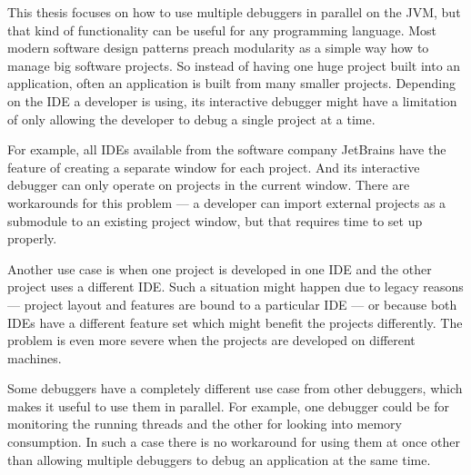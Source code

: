 \documentclass[..thesis.tex]{subfiles}
\begin{document}
This thesis focuses on how to use multiple debuggers in parallel on the JVM, but that kind of functionality can be useful for any programming language. 
Most modern software design patterns preach modularity as a simple way how to manage big software projects.
So instead of having one huge project built into an application, often an application is built from many smaller projects.
Depending on the IDE a developer is using, its interactive debugger might have a limitation of only allowing the developer to debug a single project at a time.

For example, all IDEs available from the software company JetBrains have the feature of creating a separate window for each project.
And its interactive debugger can only operate on projects in the current window.
There are workarounds for this problem --- a developer can import external projects as a submodule to an existing project window, but that requires time to set up properly.

Another use case is when one project is developed in one IDE and the other project uses a different IDE.
Such a situation might happen due to legacy reasons --- project layout and features are bound to a particular IDE --- or because both IDEs have a different feature set which might benefit the projects differently.
The problem is even more severe when the projects are developed on different machines.

Some debuggers have a completely different use case from other debuggers, which makes it useful to use them in parallel.
For example, one debugger could be for monitoring the running threads and the other for looking into memory consumption.
In such a case there is no workaround for using them at once other than allowing multiple debuggers to debug an application at the same time.
% 
% 
\end{document}
